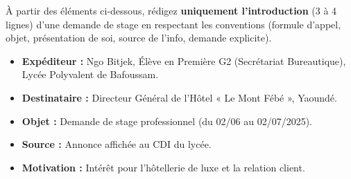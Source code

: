 \documentclass[11pt]{article}
\begin{document}
\begin{exercice}
À partir des éléments ci-dessous, rédigez \textbf{uniquement l'introduction} (3 à 4 lignes) d'une demande de stage en respectant les conventions (formule d'appel, objet, présentation de soi, source de l'info, demande explicite).

\begin{itemize}
    \item \textbf{Expéditeur :} Ngo Bitjek, Élève en Première G2 (Secrétariat Bureautique), Lycée Polyvalent de Bafoussam.
    \item \textbf{Destinataire :} Directeur Général de l'Hôtel « Le Mont Fébé », Yaoundé.
    \item \textbf{Objet :} Demande de stage professionnel (du 02/06 au 02/07/2025).
    \item \textbf{Source :} Annonce affichée au CDI du lycée.
    \item \textbf{Motivation :} Intérêt pour l'hôtellerie de luxe et la relation client.
\end{itemize}
\end{exercice}
\end{document}
